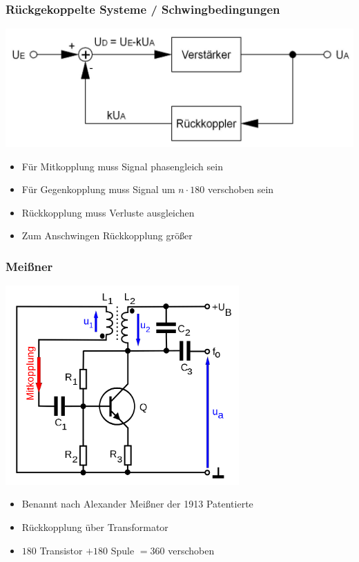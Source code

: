 \begin{frame}
    \frametitle{Rückgekoppelte Systeme / Schwingbedingungen}
        \begin{center}
        \includegraphics[width=1\textwidth]{a07/Gegenkopplung.png}
        \tiny \hyperlink{refs}{\cite{wm}} \\[3em]
     	\large
     \end{center}
    \begin{itemize}
			\item Für Mitkopplung muss Signal phasengleich sein
			\item Für Gegenkopplung muss Signal um $n \cdot 180$ verschoben sein
			\item Rückkopplung muss Verluste ausgleichen
			\item Zum Anschwingen Rückkopplung größer
    \end{itemize}
\end{frame}

\begin{frame}
    \frametitle{Meißner}
    \begin{center}
        \includegraphics[width=0.67\textwidth]{a07/Meissner_oszi.png}
        \tiny \hyperlink{refs}{\cite{wm}} \\[1em] \large
     \begin{itemize}
			\item Benannt nach Alexander Meißner der 1913 Patentierte
			\item Rückkopplung über Transformator
			\item $180$ Transistor $+ 180$ Spule $= 360$ verschoben
    \end{itemize}
    \end{center}
\end{frame}

